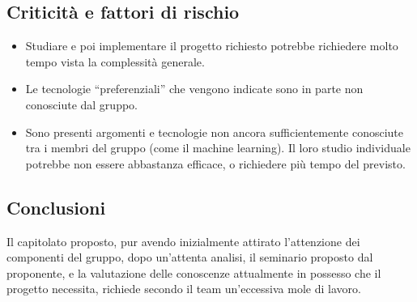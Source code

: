 \subsection{Criticità e fattori di rischio}
\begin{itemize}
    \item Studiare e poi implementare il progetto richiesto potrebbe richiedere molto tempo vista la complessità generale.
    \item Le tecnologie “preferenziali” che vengono indicate sono in parte non conosciute dal gruppo.
    \item Sono presenti argomenti e tecnologie non ancora sufficientemente conosciute tra i membri del gruppo (come il machine learning). Il loro studio individuale potrebbe non essere abbastanza efficace, o richiedere più tempo del previsto.
\end{itemize}

\subsection{Conclusioni}
Il capitolato proposto, pur avendo inizialmente attirato l'attenzione dei componenti del gruppo, dopo un'attenta analisi, il seminario proposto dal proponente, e la valutazione delle conoscenze attualmente in possesso che il progetto necessita, richiede secondo il team un'eccessiva mole di lavoro.
